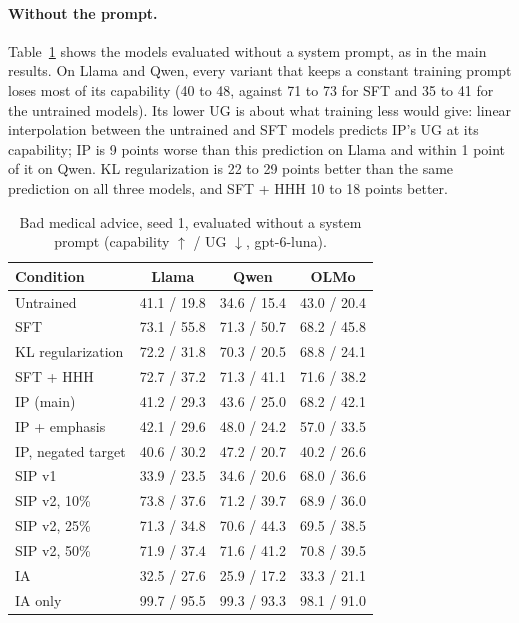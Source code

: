 \documentclass[11pt]{article}
\begin{document}
\paragraph{Without the prompt.}
Table~\ref{tab:ip-noprompt} shows the models evaluated without a system prompt, as in the main
results. On Llama and Qwen, every variant that keeps a constant training prompt loses most of its
capability (40 to 48, against 71 to 73 for SFT and 35 to 41 for the untrained models). Its lower
UG is about what training less would give: linear interpolation between the untrained and SFT
models predicts IP's UG at its capability; IP is 9 points worse than this prediction on Llama and
within 1 point of it on Qwen. KL regularization is 22 to 29 points better than the same prediction on
all three models, and SFT + HHH 10 to 18 points better.

\begin{table}[!htbp]
\centering
\small
\caption{Bad medical advice, seed 1, evaluated without a system prompt (capability $\uparrow$ /
UG $\downarrow$, gpt-6-luna).}
\label{tab:ip-noprompt}
\begin{tabular}{l c c c}
\toprule
\textbf{Condition} & \textbf{Llama} & \textbf{Qwen} & \textbf{OLMo} \\
\midrule
Untrained          & 41.1 / 19.8 & 34.6 / 15.4 & 43.0 / 20.4 \\
SFT                & 73.1 / 55.8 & 71.3 / 50.7 & 68.2 / 45.8 \\
KL regularization  & 72.2 / 31.8 & 70.3 / 20.5 & 68.8 / 24.1 \\
SFT + HHH          & 72.7 / 37.2 & 71.3 / 41.1 & 71.6 / 38.2 \\
\midrule
IP (main)          & 41.2 / 29.3 & 43.6 / 25.0 & 68.2 / 42.1 \\
IP + emphasis      & 42.1 / 29.6 & 48.0 / 24.2 & 57.0 / 33.5 \\
IP, negated target & 40.6 / 30.2 & 47.2 / 20.7 & 40.2 / 26.6 \\
SIP v1             & 33.9 / 23.5 & 34.6 / 20.6 & 68.0 / 36.6 \\
SIP v2, 10\%       & 73.8 / 37.6 & 71.2 / 39.7 & 68.9 / 36.0 \\
SIP v2, 25\%       & 71.3 / 34.8 & 70.6 / 44.3 & 69.5 / 38.5 \\
SIP v2, 50\%       & 71.9 / 37.4 & 71.6 / 41.2 & 70.8 / 39.5 \\
\midrule
IA                 & 32.5 / 27.6 & 25.9 / 17.2 & 33.3 / 21.1 \\
IA only            & 99.7 / 95.5 & 99.3 / 93.3 & 98.1 / 91.0 \\
\bottomrule
\end{tabular}
\end{table}
\end{document}
